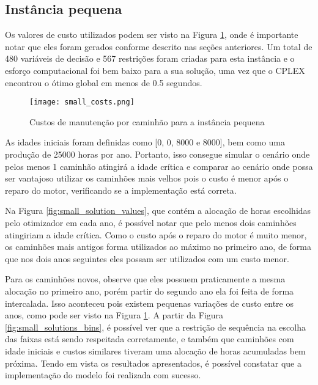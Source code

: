 \documentclass[conference]{IEEEtran}
\begin{document}
\subsection{Instância pequena}

Os valores de custo utilizados podem ser visto na Figura \ref{fig:small_costs}, onde é importante notar que eles foram gerados conforme descrito nas seções anteriores. Um total de 480 variáveis de decisão e 567 restrições foram criadas para esta instância e o esforço computacional foi bem baixo para a sua solução, uma vez que o CPLEX encontrou o ótimo global em menos de 0.5 segundos.

\begin{figure}[h!]
	\centering
	\texttt{[image: small\_costs.png]}
	\caption{Custos de manutenção por caminhão para a instância pequena}
	\label{fig:small_costs}
\end{figure}

As idades iniciais foram definidas como [0, 0, 8000 e 8000], bem como uma produção de 25000 horas por ano. Portanto, isso consegue simular o cenário onde pelos menos 1 caminhão atingirá a idade crítica e comparar ao cenário onde possa ser vantajoso utilizar os caminhões mais velhos pois o custo é menor após o reparo do motor, verificando se a implementação está correta. 

Na Figura \ref{fig:small_solution_values}, que contém a alocação de horas escolhidas pelo otimizador em cada ano, é possível notar que pelo menos dois caminhões atingiriam a idade crítica. Como o custo após o reparo do motor é muito menor, os caminhões mais antigos forma utilizados ao máximo no primeiro ano, de forma que nos dois anos seguintes eles possam ser utilizados com um custo menor. 

Para os caminhões novos, observe que eles possuem praticamente a mesma alocação no primeiro ano, porém partir do segundo ano ela foi feita de forma intercalada. Isso aconteceu pois existem pequenas variações de custo entre os anos, como pode ser visto na Figura \ref{fig:small_costs}. A partir da Figura \ref{fig:small_solutions_bins}, é possível ver que a restrição de sequência na escolha das faixas está sendo respeitada corretamente, e também que caminhões com idade iniciais e custos similares tiveram uma alocação de horas acumuladas bem próxima. Tendo em vista os resultados apresentados, é possível constatar que a implementação do modelo foi realizada com sucesso.

\end{document}
